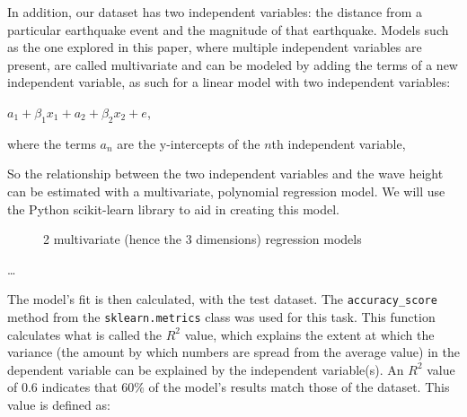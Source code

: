 \documentclass[11pt,letterpaper]{article}
\begin{document}
In addition, our dataset has two independent variables: the distance from a particular
earthquake event and the magnitude of that earthquake. Models such as the one explored
in this paper, where multiple independent variables are present, are called multivariate
and can be modeled by adding the terms of a new independent variable, as such
for a linear model with two independent variables:

$a_1 + \beta_1 x_1 + a_2 + \beta_2 x_2 + e$,

where the terms $a_n$ are the y-intercepts of the $n$th independent variable,


So the relationship between the two independent variables and the wave height can
be estimated with a multivariate, polynomial regression model. We will use the Python
scikit-learn library to aid in creating this model.

\begin{figure}[h]
    \centering
    \qquad
    \caption{2 multivariate (hence the 3 dimensions) regression models}
    \label{fig:example}
\end{figure}


\dots

The model's fit is then calculated, with the test dataset. The \verb|accuracy_score| method
from the \verb|sklearn.metrics| class was used for this task. This function calculates what
is called the $R^2$ value, which explains the extent at which the variance (the amount by which numbers
are spread from the average value) in the dependent variable can be explained by the independent
variable(s). An $R^2$ value of 0.6 indicates that 60\% of the model's results match those of the
dataset. This value is defined as:
\end{document}
